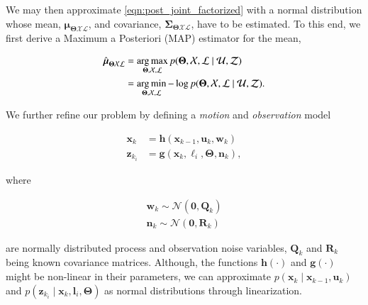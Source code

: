 \noindent We may then approximate \eqref{eqn:post_joint_factorized} with a
normal distribution whose mean, $\boldsymbol{\mu}_{\boldsymbol{\Theta}
\mathcal{X}\mathcal{L}}$, and covariance, $\boldsymbol{\Sigma}_
{\boldsymbol{\Theta}\mathcal{X}\mathcal{L}}$, have to be estimated. To this end,
we first derive a Maximum a Posteriori (MAP) estimator for the mean,

\begin{equation}\label{eqn:map_estimator}
  \begin{aligned}
  \hat{\boldsymbol{\mu}}_{\boldsymbol{\Theta}\mathcal{X}\mathcal{L}} &=
    \operatorname*{arg\,max}_{\boldsymbol{\Theta},\mathcal{X},\mathcal{L}}
    p(\boldsymbol{\Theta}, \mathcal{X},\mathcal{L} \mid\mathcal{U},\mathcal{Z})
    \\
    &= \operatorname*{arg\,min}_{\boldsymbol{\Theta},\mathcal{X},\mathcal{L}}-\log
    p(\boldsymbol{\Theta}, \mathcal{X},\mathcal{L} \mid\mathcal{U},\mathcal{Z}).
  \end{aligned}
\end{equation}

We further refine our problem by defining a \emph{motion} and \emph{observation}
model

\begin{equation}\label{eqn:process_model}
  \begin{aligned}
  \mathbf{x}_k &= \mathbf{h}(\mathbf{x}_{k-1}, \mathbf{u}_k, \mathbf{w}_k)\\
  \mathbf{z}_{k_i} &= \mathbf{g}(\mathbf{x}_{k}, \boldsymbol{\ell}_i,
    \boldsymbol{\Theta}, \mathbf{n}_k),
  \end{aligned}
\end{equation}

\noindent where

\begin{equation}\label{eqn:noise_model}
  \begin{aligned}
  \mathbf{w}_k \sim \mathcal{N}(\mathbf{0},\mathbf{Q}_k)\\
  \mathbf{n}_k \sim \mathcal{N}(\mathbf{0},\mathbf{R}_k)
  \end{aligned}
\end{equation}

\noindent are normally distributed process and observation noise variables,
$\mathbf{Q}_k$ and $\mathbf{R}_k$ being known covariance matrices. Although, the
functions $\mathbf{h}(\cdot)$ and $\mathbf{g}(\cdot)$ might be non-linear in
their parameters, we can approximate
$p(\mathbf{x}_k\mid\mathbf{x}_{k - 1},\mathbf{u}_k)$ and
$p(\mathbf{z}_{k_i}\mid\mathbf{x}_k, \mathbf{l}_i,\boldsymbol{\Theta})$ as
normal distributions through linearization.

